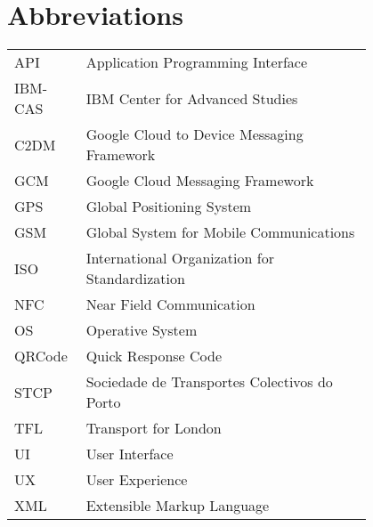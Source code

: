 \chapter*{Abbreviations}

\begin{flushleft}
\begin{tabular}{l p{0.8\linewidth}}
API      & Application Programming Interface\\
IBM-CAS  & IBM Center for Advanced Studies \\
C2DM     & Google Cloud to Device Messaging Framework \\
GCM      & Google Cloud Messaging Framework \\
GPS      & Global Positioning System \\
GSM      & Global System for Mobile Communications \\
ISO      & International Organization for Standardization \\
NFC      & Near Field Communication \\
OS       & Operative System \\
QRCode   & Quick Response Code \\
STCP     & Sociedade de Transportes Colectivos do Porto \\
TFL      & Transport for London \\
UI       & User Interface \\
UX       & User Experience \\
XML      & Extensible Markup Language \\




\end{tabular}
\end{flushleft}

